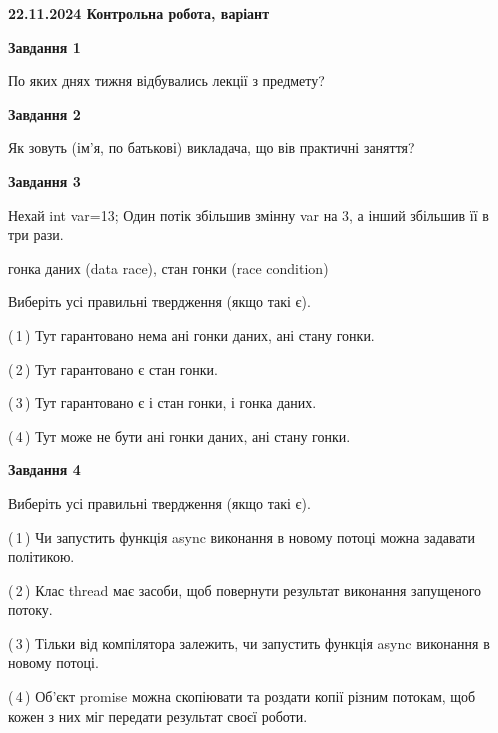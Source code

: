 \documentclass[12pt, ukrainian]{article}
\begin{document}
\begin {large}

\textbf{22.11.2024 Контрольна робота, варіант  }\par


{

\begin{center}
\textbf{Завдання 1}
\end{center}

По яких днях тижня відбувались лекції з предмету?


\begin{center}
\textbf{Завдання 2}
\end{center}

Як зовуть (ім'я, по батькові) викладача, що вів практичні заняття?


\begin{center}
\textbf{Завдання 3}
\end{center}

Нехай int var=13; Один потік збільшив змінну var на 3, а інший збільшив її в три рази.

гонка даних (data race), стан гонки (race condition)

Виберіть усі правильні твердження (якщо такі є).\par
\vspace{2mm}
(\,1\,) Тут гарантовано нема ані гонки даних, ані стану гонки.%

(\,2\,) Тут гарантовано є стан гонки.%

(\,3\,) Тут гарантовано є і стан гонки, і гонка даних.%

(\,4\,) Тут може не бути ані гонки даних, ані стану гонки.%


\begin{center}
\textbf{Завдання 4}
\end{center}

Виберіть усі правильні твердження (якщо такі є).\par
\vspace{2mm}

(\,1\,) Чи запустить функція  async виконання в новому потоці можна задавати політикою.%

(\,2\,) Клас thread має засоби, щоб повернути результат виконання запущеного потоку.%

(\,3\,) Тільки від компілятора залежить, чи запустить функція async виконання в новому потоці.%

(\,4\,) Об’єкт promise можна скопіювати та роздати копії різним потокам, щоб кожен з них міг передати результат своєї роботи.%


}
\end{large}
\end{document}

